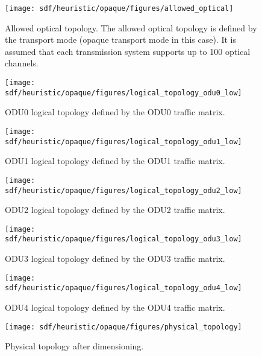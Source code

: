 \begin{figure}[H]
\centering
\texttt{[image: sdf/heuristic/opaque/figures/allowed\_optical]}
\caption{Allowed optical topology. The allowed optical topology is defined by the transport mode (opaque transport mode in this case). It is assumed that each transmission system supports up to 100 optical channels.}
\label{allowed_optical_surv_ref_low_heuristic}
\end{figure}

\begin{figure}[H]
\centering
\texttt{[image: sdf/heuristic/opaque/figures/logical\_topology\_odu0\_low]}
\caption{ODU0 logical topology defined by the ODU0 traffic matrix.}
\label{logical_ODU0_surv_ref_low_heuristic}
\end{figure}

\begin{figure}[H]
\centering
\texttt{[image: sdf/heuristic/opaque/figures/logical\_topology\_odu1\_low]}
\caption{ODU1 logical topology defined by the ODU1 traffic matrix.}
\label{logical_ODU1_surv_ref_low_heuristic}
\end{figure}

\begin{figure}[H]
\centering
\texttt{[image: sdf/heuristic/opaque/figures/logical\_topology\_odu2\_low]}
\caption{ODU2 logical topology defined by the ODU2 traffic matrix.}
\label{logical_ODU2_surv_ref_low_heuristic}
\end{figure}

\begin{figure}[H]
\centering
\texttt{[image: sdf/heuristic/opaque/figures/logical\_topology\_odu3\_low]}
\caption{ODU3 logical topology defined by the ODU3 traffic matrix.}
\label{logical_ODU3_surv_ref_low_heuristic}
\end{figure}

\begin{figure}[H]
\centering
\texttt{[image: sdf/heuristic/opaque/figures/logical\_topology\_odu4\_low]}
\caption{ODU4 logical topology defined by the ODU4 traffic matrix.}
\label{logical_ODU4_surv_ref_low_heuristic}
\end{figure}

\begin{figure}[H]
\centering
\texttt{[image: sdf/heuristic/opaque/figures/physical\_topology]}
\caption{Physical topology after dimensioning.}
\label{physical_topology_surv_ref_low_heuristic}
\end{figure}

